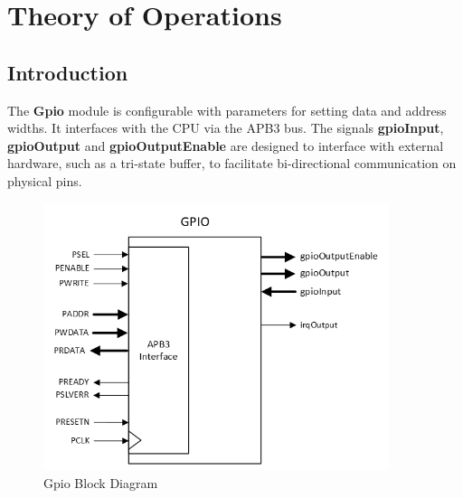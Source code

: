 \section{Theory of Operations}

\subsection{Introduction}
The \textbf{Gpio} module is configurable with parameters for setting data and address widths. It interfaces with the CPU via the APB3 bus. The signals \textbf{gpioInput}, \textbf{gpioOutput} and \textbf{gpioOutputEnable} are designed to interface with external hardware, such as a tri-state buffer, to facilitate bi-directional communication on physical pins.

\begin{figure}[h]
  \includegraphics[width=0.90\textwidth]{images/block-diagram-gpio.png}
  \caption{Gpio Block Diagram}\label{fig:block-diagram}
\end{figure}




